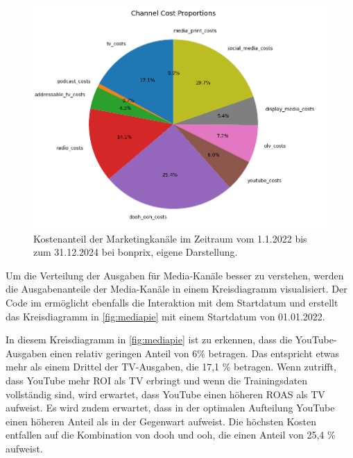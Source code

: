 \begin{figure}[H]
    \centering
    \includegraphics[width=0.8\linewidth]{images/mediapie.png}
    \caption{Kostenanteil der Marketingkanäle im Zeitraum vom 1.1.2022 bis zum 31.12.2024 bei bonprix, eigene Darstellung.}
    \label{fig:mediapie}
\end{figure}
\noindent
Um die Verteilung der Ausgaben für Media-Kanäle besser zu verstehen, werden die Ausgabenanteile der Media-Kanäle in einem Kreisdiagramm visualisiert. Der Code im  ermöglicht ebenfalls die Interaktion mit dem Startdatum und erstellt das Kreisdiagramm in \autoref{fig:mediapie} mit einem Startdatum von 01.01.2022.\par
In diesem Kreisdiagramm in \autoref{fig:mediapie} ist zu erkennen, dass die YouTube-Ausgaben einen relativ geringen Anteil von 6\% betragen. Das entspricht etwas mehr als einem Drittel der TV-Ausgaben, die 17,1 \% betragen. Wenn  zutrifft, dass YouTube mehr \ac{ROI} als TV erbringt und wenn die Trainingsdaten vollständig sind, wird erwartet, dass YouTube einen höheren \ac{ROAS} als TV aufweist. Es wird zudem erwartet, dass in der optimalen Aufteilung YouTube einen höheren Anteil als in der Gegenwart aufweist. Die höchsten Kosten entfallen auf die Kombination von \ac{dooh} und \ac{ooh}, die einen Anteil von 25,4 \% aufweist.
\newpage
